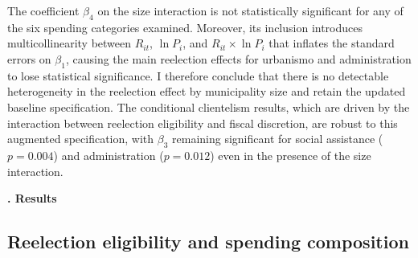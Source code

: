 \documentclass[12pt, a4paper]{article}
\newcounter{headercounter}
\newcommand{\header}[1]{\begin{center}{\large \textbf{\Roman{headercounter}. #1}} \end{center} \stepcounter{headercounter}}
\begin{document}
The coefficient $\beta_4$ on the size interaction is not statistically significant for any of the six spending categories examined. Moreover, its inclusion introduces multicollinearity between $R_{it}$, $\ln P_i$, and $R_{it} \times \ln P_i$ that inflates the standard errors on $\beta_1$, causing the main reelection effects for urbanismo and administration to lose statistical significance. I therefore conclude that there is no detectable heterogeneity in the reelection effect by municipality size and retain the updated baseline specification. The conditional clientelism results, which are driven by the interaction between reelection eligibility and fiscal discretion, are robust to this augmented specification, with $\beta_3$ remaining significant for social assistance ($p = 0.004$) and administration ($p = 0.012$) even in the presence of the size interaction.

\header{Results}

\subsection*{Reelection eligibility and spending composition}

\begin{table}[htbp]
\centering
\caption{\small{Effect of Reelection Eligibility on Discretionary Spending Shares ($\hat{\beta}_1$)}}
\label{tab:beta1}
\end{table}
\end{document}

